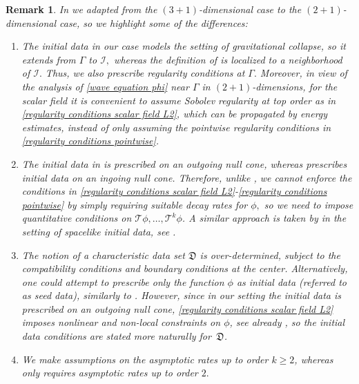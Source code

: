 \documentclass[11pt]{article}
\newtheorem{remark}{Remark}[section]
\numberwithin{equation}{section}
\begin{document}
\begin{remark}\label{differences from HS remark}
    In  we adapted \cite[Definition 3.3]{localwellposed} from the $(3+1)$-dimensional case to the $(2+1)$-dimensional case, so we highlight some of the differences:
    \begin{enumerate}
        \item The initial data in our case models the setting of gravitational collapse, so it extends from $\Gamma$ to $\mathcal{I},$ whereas the definition of \cite{localwellposed} is localized to a neighborhood of $\mathcal{I}.$ Thus, we also prescribe regularity conditions at $\Gamma.$ Moreover, in view of the analysis of \eqref{wave equation phi} near $\Gamma$ in $(2+1)$-dimensions, for the scalar field it is convenient to assume Sobolev regularity at top order as in \eqref{regularity conditions scalar field L2}, which can be propagated by energy estimates, instead of only assuming the pointwise regularity conditions in \eqref{regularity conditions pointwise}.

        \item The initial data in  is prescribed on an outgoing null cone, whereas \cite{localwellposed} prescribes initial data on an ingoing null cone. Therefore, unlike \cite{localwellposed}, we cannot enforce the conditions in \eqref{regularity conditions scalar field L2}-\eqref{regularity conditions pointwise} by simply requiring suitable decay rates for $\phi,$ so we need to impose quantitative conditions on $\mathcal{T}\phi,\ldots,\mathcal{T}^k\phi$. A similar approach is taken by \cite{holzegellinear} in the setting of spacelike initial data, see \cite[Remark~5.1]{holzegellinear}.

        \item The notion of a characteristic data set $\mathfrak{D}$ is over-determined, subject to the compatibility conditions and boundary conditions at the center. Alternatively, one could attempt to prescribe only the function $\phi$ as initial data (referred to as \textit{seed data}), similarly to \cite{localwellposed}. However, since in our setting the initial data is prescribed on an outgoing null cone, \eqref{regularity conditions scalar field L2} imposes nonlinear and non-local constraints on $\phi$, see already , so the initial data conditions are stated more naturally for~$\mathfrak{D}$.
        \item We make assumptions on the asymptotic rates up to order $k\geq2$, whereas \cite{localwellposed} only requires asymptotic rates up to order $2.$ 
    \end{enumerate}
\end{remark}
\end{document}
